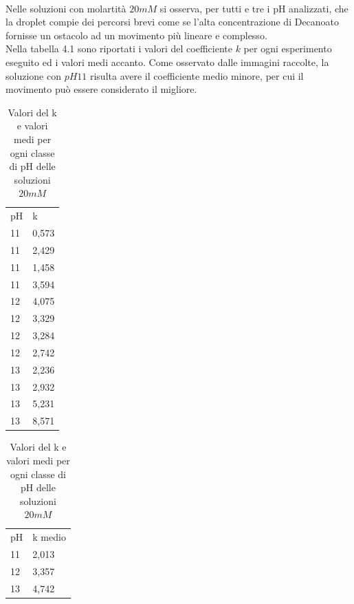 \\Nelle soluzioni con molartità $20mM$ si osserva, per tutti e tre i pH analizzati, che la droplet compie dei percorsi brevi come se l'alta concentrazione di Decanoato fornisse un ostacolo ad un movimento più lineare e complesso. 
\\Nella tabella 4.1 sono riportati i valori del coefficiente $k$ per ogni esperimento eseguito ed i valori medi accanto. Come osservato dalle immagini raccolte, la soluzione con $pH11$ risulta avere il coefficiente medio minore, per cui il movimento può essere considerato il migliore.  
\begin{table}
\caption{Valori del k e valori medi per ogni classe di pH delle soluzioni $20mM$}
\begin{center}
\begin{tabular}{ll}
pH & k     \\
11 & 0,573 \\
11 & 2,429 \\
11 & 1,458 \\
11 & 3,594 \\
12 & 4,075 \\
12 & 3,329 \\
12 & 3,284 \\
12 & 2,742  \\
13 & 2,236 \\
13 & 2,932 \\
13 & 5,231 \\
13 & 8,571
\end{tabular}
\begin{tabular}{ll}
pH & k medio \\
11 & 2,013  \\
12 & 3,357   \\
13 & 4,742
\end{tabular}
\end{center}
\end{table}
\pagebreak
